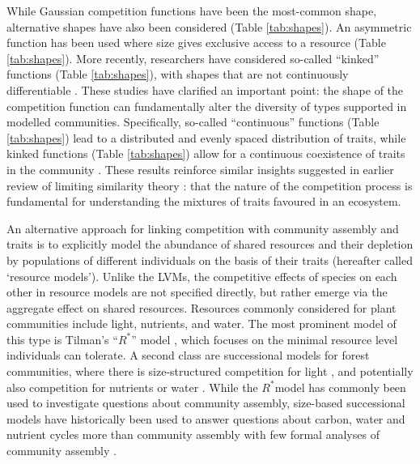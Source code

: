 \documentclass[a4paper,11pt]{article}
\newcommand{\Rstar}{\ensuremath{R^*}}
\begin{document}
While Gaussian competition functions have been the most-common shape, alternative shapes have also been considered (Table \ref{tab:shapes}). An asymmetric function has been used where size gives exclusive access to a resource \citep[e.g.]{Law-1997, Kisdi-1999, Geritz-1999, Egas-2004, Calcagno-2006, DAndrea-2013} (Table \ref{tab:shapes}). More recently, researchers have considered so-called ``kinked'' functions (Table \ref{tab:shapes}), with shapes that are not continuously differentiable \citep{Calcagno-2006, Scheffer-2006, Pigolotti-2007, Leimar-2013, Barabas-2013}. These studies have clarified an important point: the shape of the competition function can fundamentally alter the diversity of types supported in modelled communities. Specifically, so-called ``continuous'' functions (Table \ref{tab:shapes}) lead to a distributed and evenly spaced distribution of traits, while kinked functions (Table \ref{tab:shapes}) allow for a continuous coexistence of traits in the community \citep{Scheffer-2006, Pigolotti-2007, Leimar-2013, Barabas-2013, DAndrea-2013}. These results reinforce similar insights suggested in earlier review of limiting similarity theory \citep{Abrams-1983}: that the nature of the competition process is fundamental for understanding the mixtures of traits favoured in an ecosystem.

An alternative approach for linking competition with community assembly and traits is to explicitly model the abundance of shared resources and their depletion by populations of different individuals on the basis of their traits (hereafter called `resource models'). Unlike the LVMs, the competitive effects of species on each other in resource models are not specified directly, but rather emerge via the aggregate effect on shared resources. Resources commonly considered for plant communities include light, nutrients, and water. The most prominent model of this type is Tilman's ``\Rstar'' model \citep{Tilman-1977, Tilman-1982}, which focuses on the minimal resource level individuals can tolerate. A second class are successional models for forest communities, where there is size-structured competition for light \citep{Huston-1987,Kohyama-1993,Moorcroft-2001,Falster-2011,Falster-2016,Weng-2019}, and potentially also competition for nutrients or water \citep{Moorcroft-2001,Farrior-2013, Smith-2014, Fisher-2018,Weng-2019}. While the \Rstar  model has commonly been used to investigate questions about community assembly, size-based successional models have historically been used to answer questions about carbon, water and nutrient cycles more than community assembly \citep{Moorcroft-2001,Medvigy-2012,Smith-2014,Fisher-2018} with few formal analyses of community assembly \citep{Kohyama-1993}.
\end{document}
